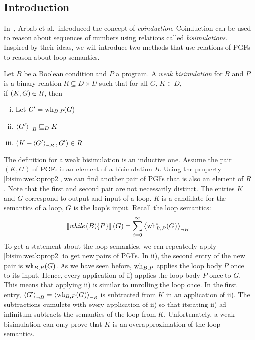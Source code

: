 \subsection*{Introduction}
In~\cite{arbab:coinduction}, Arbab et al.\ introduced the concept of \emph{coinduction}.
Coinduction can be used to reason about sequences of numbers using relations called \emph{bisimulations}.
Inspired by their ideas, we will introduce two methods that use relations of PGFs to reason about loop semantics.

\begin{definition}
  Let $B$ be a Boolean condition and $P$ a program.
  A \emph{weak bisimulation} for $B$ and $P$ is a binary relation $R \subseteq D \times D$ such that
  for all $G$, $K \in D$, \\
  if $\left( K, G \right) \in R$, then
  \begin{enumerate}[i)]
    \item[] Let $G' = \operatorname{wh}_{B, P}(G)$
    \item $\left\langle G' \right\rangle_{\lnot B} \sqsubseteq_{D} K$	\label{bisim:weak:prop1}
    \item $\left( K - \left\langle G' \right\rangle_{\lnot B}, G' \right) \in R$	\label{bisim:weak:prop2}
  \end{enumerate}
\end{definition}

The definition for a weak bisimulation is an inductive one.
Assume the pair $(K, G)$ of PGFs is an element of a bisimulation $R$.
Using the property \ref{bisim:weak:prop2}, we can find another pair of PGFs that is also an element of $R$.
Note that the first and second pair are not necessarily distinct.
The entries $K$ and $G$ correspond to output and input of a loop.
$K$ is a candidate for the semantics of a loop, $G$ is the loop's input.
Recall the loop semantics:
\[ \left\llbracket \textit{while}\,(B) \{P\} \right\rrbracket(G) = \sum_{i=0}^{\infty}  \left\langle \operatorname{wh}_{B, P}^i(G) \right\rangle_{\lnot B} \]
To get a statement about the loop semantics, we can repeatedly apply \ref{bisim:weak:prop2} to get new pairs of PGFs.
In ii), the second entry of the new pair is $\operatorname{wh}_{B, P}(G)$.
As we have seen before, $\operatorname{wh}_{B, P}$ applies the loop body $P$ once to its input.
Hence, every application of ii) applies the loop body $P$ once to $G$.
This means that applying ii) is similar to unrolling the loop once.
In the first entry, $\left\langle G' \right\rangle_{\lnot B} = \left\langle \operatorname{wh}_{B, P}(G) \right\rangle_{\lnot B}$ is subtracted from $K$ in an application of ii).
The subtractions cumulate with every application of ii) so that iterating ii) ad infinitum subtracts the semantics of the loop from $K$.
Unfortunately, a weak bisimulation can only prove that $K$ is an overapproximation of the loop semantics.

